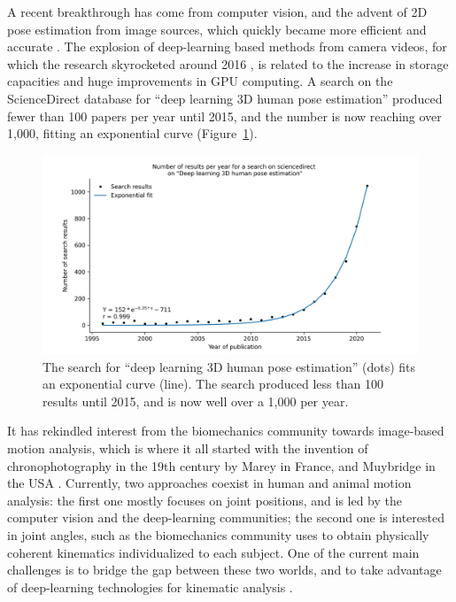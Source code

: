 A recent breakthrough has come from computer vision, and the advent of 2D pose estimation from image sources, which quickly became more efficient and accurate \cite{Mathis2020}. The explosion of deep-learning based methods from camera videos, for which the research skyrocketed around 2016 \cite{Wang2021a}, is related to the increase in storage capacities and huge improvements in GPU computing. A search on the ScienceDirect database for “deep learning 3D human pose estimation” produced fewer than 100 papers per year until 2015, and the number is now reaching over 1,000, fitting an exponential curve (Figure~\ref{fig_exp}).

\clearpage
\begin{figure}[hbtp]
	\centering
	\def\svgwidth{1\columnwidth}
	\fontsize{10pt}{10pt}\selectfont
	\includegraphics[width=\linewidth]{"../Chap1/Figures/Fig_Exp.png"}
	\caption{The search for “deep learning 3D human pose estimation” (dots) fits an exponential curve (line). The search produced less than 100 results until 2015, and is now well over a 1,000 per year.}
	\label{fig_exp}
\end{figure}

It has rekindled interest from the biomechanics community towards image-based motion analysis, which is where it all started with the invention of chronophotography in the 19th century by Marey in France, and Muybridge in the USA \cite{Baker2007}. Currently, two approaches coexist in human and animal motion analysis: the first one mostly focuses on joint positions, and is led by the computer vision and the deep-learning communities; the second one is interested in joint angles, such as the biomechanics community uses to obtain physically coherent kinematics individualized to each subject. One of the current main challenges is to bridge the gap between these two worlds, and to take advantage of deep-learning technologies for kinematic analysis \cite{Cronin2021,Seethapathi2019}. 

